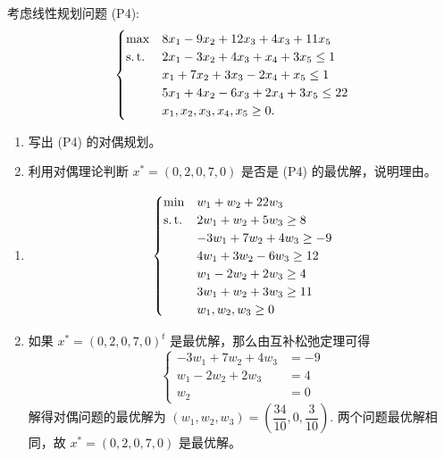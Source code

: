 \begin{Problem}
    考虑线性规划问题 (P4):
    \[\begin{cases}
        \max & 8x_1 - 9x_2 + 12x_3 + 4x_3 + 11x_5\\
        \operatorname{s.t.} &2x_1 - 3x_2 + 4x_3 + x_4 + 3x_5 \le 1\\
        &x_1 + 7x_2 + 3x_3 - 2x_4 + x_5 \le 1\\
        &5x_1 + 4x_2 - 6x_3 + 2x_4 + 3x_5 \le 22\\
        &x_1, x_2, x_3, x_4, x_5 \ge 0\text{.}
    \end{cases}\]
    \begin{enumerate}
        \item 写出 (P4) 的对偶规划。
        \item 利用对偶理论判断 $x^* = (0, 2, 0, 7, 0)$ 是否是 (P4) 的最优解，说明理由。
    \end{enumerate}

    \Answer \text{} \begin{enumerate}
        \item \[\begin{cases}
            \min &w_1 + w_2 + 22w_3\\
            \operatorname{s.t.} &2w_1 + w_2 + 5w_3 \ge 8\\
            &-3w_1 + 7w_2 + 4w_3 \ge -9\\
            &4w_1 + 3w_2 - 6w_3 \ge 12\\
            &w_1 - 2w_2 + 2w_3 \ge 4\\
            &3w_1 + w_2 + 3w_3 \ge 11\\
            &w_1, w_2, w_3 \ge 0
        \end{cases}\]
        \item 如果 $x^* = (0, 2, 0, 7, 0)^t$ 是最优解，那么由互补松弛定理可得 
        \[\begin{cases}
            -3w_1 + 7w_2 + 4w_3 &= -9\\
            w_1 - 2w_2 + 2w_3 &= 4\\
            w_2 &= 0
        \end{cases}\]
        解得对偶问题的最优解为 $(w_1, w_2, w_3) = \left(\dfrac{34}{10}, 0, \dfrac{3}{10}\right)$. 两个问题最优解相同，故 $x^* = (0, 2, 0, 7, 0)$ 是最优解。
    \end{enumerate}
\end{Problem}

